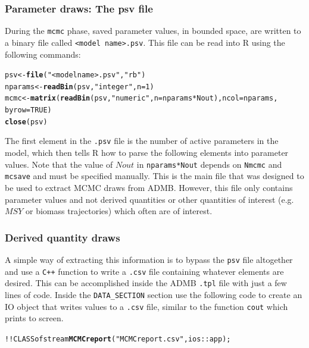 \documentclass{article}\usepackage[]{graphicx}\usepackage[]{color}
\makeatletter
\newcommand{\hlnum}[1]{\textcolor[rgb]{0.686,0.059,0.569}{#1}}%
\newcommand{\hlstr}[1]{\textcolor[rgb]{0.192,0.494,0.8}{#1}}%
\newcommand{\hlopt}[1]{\textcolor[rgb]{0,0,0}{#1}}%
\newcommand{\hlstd}[1]{\textcolor[rgb]{0.345,0.345,0.345}{#1}}%
\newcommand{\hlkwb}[1]{\textcolor[rgb]{0.69,0.353,0.396}{#1}}%
\newcommand{\hlkwc}[1]{\textcolor[rgb]{0.333,0.667,0.333}{#1}}%
\newcommand{\hlkwd}[1]{\textcolor[rgb]{0.737,0.353,0.396}{\textbf{#1}}}%
\newenvironment{kframe}{%
 \def\at@end@of@kframe{}%
 \ifinner\ifhmode%
  \def\at@end@of@kframe{\end{minipage}}%
  \begin{minipage}{\columnwidth}%
 \fi\fi%
 \def\FrameCommand##1{\hskip\@totalleftmargin \hskip-\fboxsep
 \colorbox{shadecolor}{##1}\hskip-\fboxsep
     \hskip-\linewidth \hskip-\@totalleftmargin \hskip\columnwidth}%
 \MakeFramed {\advance\hsize-\width
   \@totalleftmargin\z@ \linewidth\hsize
   \@setminipage}}%
 {\par\unskip\endMakeFramed%
 \at@end@of@kframe}
\newenvironment{knitrout}{}{} %
\makeatother
\begin{document}
\subsubsection{Parameter draws: The psv file}
During the \texttt{mcmc} phase, saved parameter values, in
bounded space, are written to a binary file called
\texttt{<model name>.psv}. This file can be read into R
using the following commands:
\begin{knitrout}
\color{fgcolor}\begin{kframe}
\begin{alltt}
\hlstd{psv} \hlkwb{<-} \hlkwd{file}\hlstd{(}\hlstr{"<model name>.psv"}\hlstd{,} \hlstr{"rb"}\hlstd{)}
\hlstd{nparams} \hlkwb{<-} \hlkwd{readBin}\hlstd{(psv,} \hlstr{"integer"}\hlstd{,} \hlkwc{n} \hlstd{=} \hlnum{1}\hlstd{)}
\hlstd{mcmc} \hlkwb{<-} \hlkwd{matrix}\hlstd{(}\hlkwd{readBin}\hlstd{(psv,} \hlstr{"numeric"}\hlstd{,} \hlkwc{n} \hlstd{= nparams} \hlopt{*} \hlstd{Nout),} \hlkwc{ncol} \hlstd{= nparams,}
    \hlkwc{byrow} \hlstd{=} \hlnum{TRUE}\hlstd{)}
\hlkwd{close}\hlstd{(psv)}
\end{alltt}
\end{kframe}
\end{knitrout}

The first element in the \texttt{.psv} file is the number of
active parameters in the model, which then tells R how to
parse the following elements into parameter values. Note
that the value of $Nout$ in \texttt{nparams*Nout} depends on
\texttt{Nmcmc} and \texttt{mcsave} and must be specified
manually. This is the main file that was designed to be used
to extract MCMC draws from ADMB. However, this file only
contains parameter values and not derived quantities or
other quantities of interest (e.g. $MSY$ or biomass
trajectories) which often are of interest. 
\subsubsection{Derived quantity draws}

A simple way of extracting this information is to bypass the
\texttt{psv} file altogether and use a \texttt{C++} function
to write a \texttt{.csv} file containing whatever elements
are desired. This can be accomplished inside the ADMB
\texttt{.tpl} file with just a few lines of code. Inside the
\texttt{DATA\_SECTION} section use the following code to
create an IO object that writes values to a \texttt{.csv}
file, similar to the function \texttt{cout} which prints to
screen.
\begin{knitrout}
\color{fgcolor}\begin{kframe}
\begin{alltt}
 !!CLASS ofstream \hlkwd{MCMCreport}(\hlstr{"MCMCreport.csv"},ios::app);
\end{alltt}
\end{kframe}
\end{knitrout}
\end{document}
